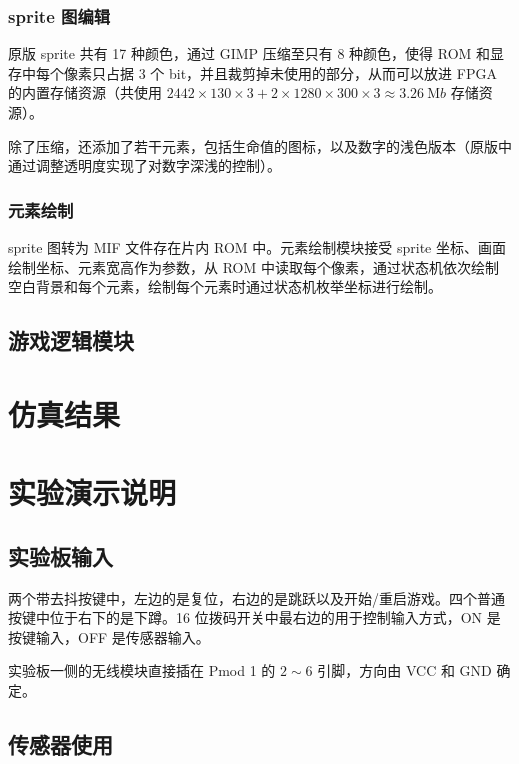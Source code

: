 \documentclass[UTF8, 11pt, fontset=none]{ctexart}
\begin{document}
\subsubsection{sprite 图编辑}

原版 sprite 共有 17 种颜色，通过 GIMP 压缩至只有 8 种颜色，使得 ROM 和显存中每个像素只占据 3 个 bit，并且裁剪掉未使用的部分，从而可以放进 FPGA 的内置存储资源（共使用 $2442 \times 130 \times 3 + 2 \times 1280 \times 300 \times 3 \approx \SI{3.26}{\mega b}$ 存储资源）。

除了压缩，还添加了若干元素，包括生命值的图标，以及数字的浅色版本（原版中通过调整透明度实现了对数字深浅的控制）。

\subsubsection{元素绘制}

sprite 图转为 MIF 文件存在片内 ROM 中。元素绘制模块接受 sprite 坐标、画面绘制坐标、元素宽高作为参数，从 ROM 中读取每个像素，通过状态机依次绘制空白背景和每个元素，绘制每个元素时通过状态机枚举坐标进行绘制。

\subsection{游戏逻辑模块}

\section{仿真结果}

\section{实验演示说明}

\subsection{实验板输入}

两个带去抖按键中，左边的是复位，右边的是跳跃以及开始/重启游戏。四个普通按键中位于右下的是下蹲。16 位拨码开关中最右边的用于控制输入方式，ON 是按键输入，OFF 是传感器输入。

实验板一侧的无线模块直接插在 Pmod 1 的 $2 \sim 6$ 引脚，方向由 VCC 和 GND 确定。

\subsection{传感器使用}
\end{document}

